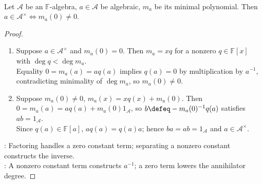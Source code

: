 \begin{theorem} \label{thm:algebraic-element-annihilator-and-invertibility} \\
Let $\mathcal{A}$ be an $\mathbb{F}$-algebra, $a\in\mathcal{A}$ be algebraic, $m_a$ be its minimal polynomial. Then $a\in\mathcal{A}^{\times}\Longleftrightarrow m_a(0)\neq0$.
\begin{proof}
\begin{enumerate}[label=\roman*.]
\setlength{\itemsep}{0pt}
\item[$(\Rightarrow)$] Suppose $a\in\mathcal{A}^{\times}$ and $m_a(0)=0$. Then $m_a=xq$ for a nonzero $q\in\mathbb{F}[x]$ with $\deg q<\deg m_a$.\\
Equality $0=m_a(a)=aq(a)$ implies $q(a)=0$ by multiplication by $a^{-1}$, contradicting minimality of $\deg m_a$, so $m_a(0)\neq0$.
\item[$(\Leftarrow)$] Suppose $m_a(0)\neq0$, $m_a(x)=xq(x)+m_a(0)$. Then $0=m_a(a)=aq(a)+m_a(0)1_{\mathcal{A}}$, so $b\defeq-m_a(0)^{-1}q(a)$ satisfies $ab=1_{\mathcal{A}}$.\\
Since $q(a)\in\mathbb{F}[a]$, $aq(a)=q(a)a$; hence $ba=ab=1_{\mathcal{A}}$ and $a\in\mathcal{A}^{\times}$.
\end{enumerate}
: Factoring handles a zero constant term; separating a nonzero constant constructs the inverse.\\
: A nonzero constant term constructs $a^{-1}$; a zero term lowers the annihilator degree.
\end{proof}
\end{theorem}
